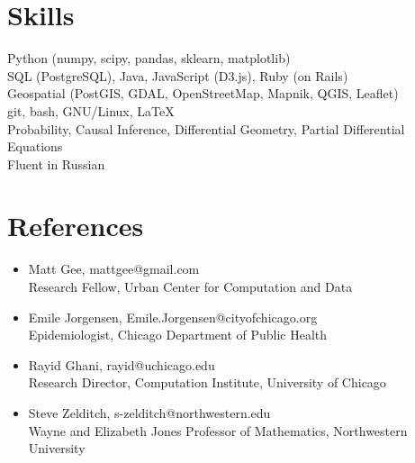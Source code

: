 \documentclass[margin,line]{resume}
\begin{document}
\begin{resume}
    \section{\mysidestyle Skills}
		Python (numpy, scipy, pandas, sklearn, matplotlib) \\
                SQL (PostgreSQL), Java, JavaScript (D3.js), Ruby (on Rails)\\
                Geospatial (PostGIS, GDAL, OpenStreetMap, Mapnik, QGIS, Leaflet)\\
                git, bash, GNU/Linux, \LaTeX\\
		Probability, Causal Inference, Differential Geometry, Partial Differential Equations\\
                Fluent in Russian
	\section{\mysidestyle References}
		\begin{itemize}
	\item Matt Gee, mattgee@gmail.com \\
		Research Fellow, Urban Center for Computation and Data 
	\item Emile Jorgensen, Emile.Jorgensen@cityofchicago.org \\
		Epidemiologist, Chicago Department of Public Health
	\item Rayid Ghani, rayid@uchicago.edu \\
		Research Director, Computation Institute, University of Chicago 
	\item Steve Zelditch, s-zelditch@northwestern.edu \\
		Wayne and Elizabeth Jones Professor of Mathematics, Northwestern University 
		\end{itemize}
\end{resume}
\end{document}
